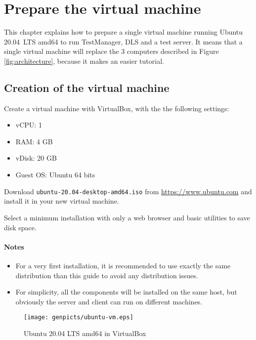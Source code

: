 \chapter{Prepare the virtual machine}


This chapter explains how to prepare a single virtual machine running
Ubuntu 20.04~LTS amd64 to run TestManager, DLS and a test server.
It means that a single virtual machine will replace the 3 computers
described in Figure \ref{fig:architecture}, because it makes an easier
tutorial.


\section{Creation of the virtual machine}

Create a virtual machine with VirtualBox, with the the following settings:
\begin{itemize}
\item vCPU: 1
\item RAM: 4 GB
\item vDisk: 20 GB
\item Guest OS: Ubuntu 64 bits
\end{itemize}


Download \texttt{ubuntu-20.04-desktop-amd64.iso} from
\url{https://www.ubuntu.com}
and install it in your new virtual machine.

Select a minimum installation with only a web browser and basic utilities
to save disk space.


\subsubsection{Notes}

\begin{itemize}
\item For a very first installation, it is recommended to use exactly the same
  distribution than this guide to avoid any distribution issues.
\item For simplicity, all the components will be installed on the same host,
  but obviously the server and client can run on different machines.
\end{itemize}


\begin{figure}[h!]
  \texttt{[image: genpicts/ubuntu-vm.eps]}
  \caption{Ubuntu 20.04 LTS amd64 in VirtualBox}
  \label{fig:ubuntu-vm}
\end{figure}
